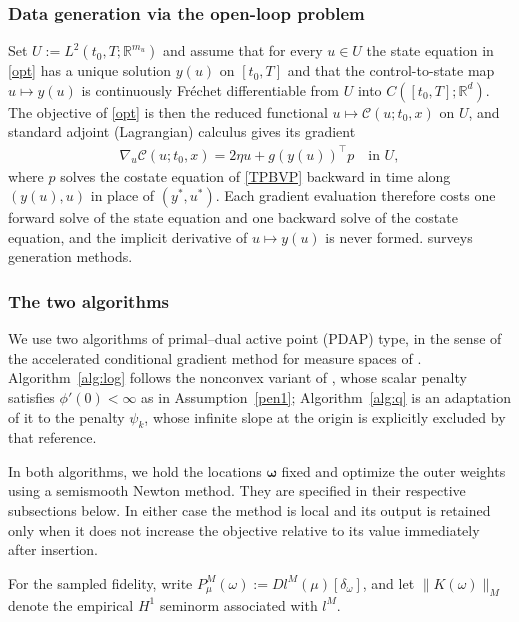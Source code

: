 \documentclass[11pt]{amsart}
\theoremstyle{definition}
\theoremstyle{remark}
\begin{document}
\subsubsection*{Data generation via the open-loop problem}

Set $U:=L^2(t_0,T;\mathbb R^{m_u})$ and assume that for every $u\in U$ the
state equation in \eqref{opt} has a unique solution $y(u)$ on $[t_0,T]$ and
that the control-to-state map $u\mapsto y(u)$ is continuously Fr\'echet
differentiable from $U$ into $C([t_0,T];\mathbb R^d)$. The objective of
\eqref{opt} is then the reduced functional $u\mapsto\mathcal C(u;t_0,x)$ on
$U$, and standard adjoint (Lagrangian) calculus
\cite{hinze2009optimization} gives its gradient
\begin{align*}
	\nabla_u\mathcal C(u;t_0,x)
	=2\eta u+g(y(u))^\top p\quad\text{in }U,
\end{align*}
where $p$ solves the costate equation of \eqref{TPBVP} backward in time along
$(y(u),u)$ in place of $(y^*,u^*)$. Each gradient evaluation therefore costs
one forward solve of the state equation and one backward solve of the costate
equation, and the implicit derivative of $u\mapsto y(u)$ is never formed.
\cite{kang2021algorithms} surveys generation methods. 

\subsubsection*{The two algorithms}
We use two algorithms of primal--dual active point (PDAP)
type, in the sense of the accelerated conditional gradient method for measure
spaces of \cite{pieper2021linear}. Algorithm~\ref{alg:log} follows the
nonconvex variant of \cite{pieper2022nonconvex}, whose scalar penalty
satisfies $\phi'(0)<\infty$ as in Assumption~\ref{pen1}; Algorithm~\ref{alg:q}
is an adaptation of it to the penalty $\psi_k$, whose infinite slope at the
origin is explicitly excluded by that reference.

In both algorithms, we hold the locations $\boldsymbol\omega$ fixed and
optimize the outer weights using a semismooth Newton method. They are specified in
their respective subsections below. In either case the method is local and its
output is retained only when it does not increase the objective relative to its
value immediately after insertion.

For the sampled fidelity, write
$P^M_\mu(\omega):=D l^M(\mu)[\delta_\omega]$, and let
$\|K(\omega)\|_M$ denote the empirical $H^1$ seminorm associated with
$l^M$.
\end{document}
